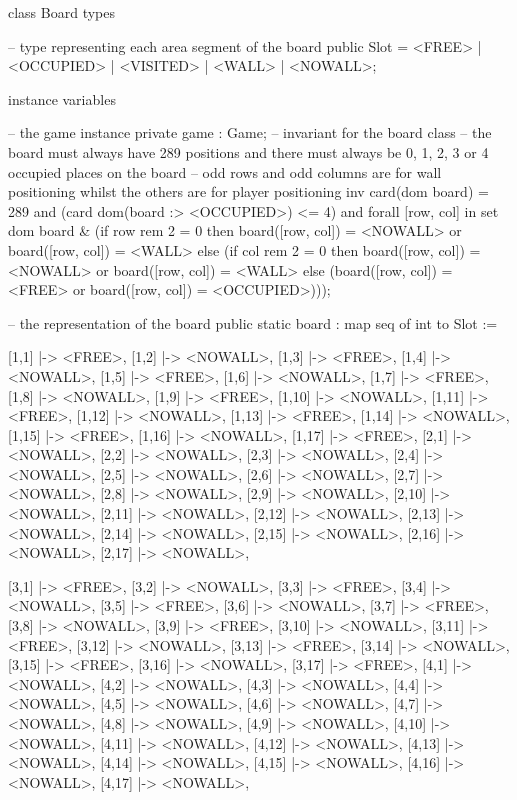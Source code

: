 \begin{vdmpp}[breaklines=true]
class Board
 types
 
  -- type representing each area segment of the board
  public Slot = <FREE> | <OCCUPIED> | <VISITED> | <WALL> | <NOWALL>;

 instance variables
 
  -- the game instance
  private game : Game;
  -- invariant for the board class
  -- the board must always have 289 positions and there must always be 0, 1, 2, 3 or 4 occupied places on the board
  -- odd rows and odd columns are for wall positioning whilst the others are for player positioning
  inv card(dom board) = 289 and (card dom(board :> {<OCCUPIED>}) <= 4)
    and forall [row, col] in set dom board & 
      (if row rem 2 = 0 then board([row, col]) = <NOWALL> or board([row, col]) = <WALL>
        else (if col rem 2 = 0 then board([row, col]) = <NOWALL> or board([row, col]) = <WALL>
          else (board([row, col]) = <FREE> or board([row, col]) = <OCCUPIED>)));
 
  -- the representation of the board
  public static board : map seq of int to Slot := 
    { 
     [1,1] |-> <FREE>, [1,2] |-> <NOWALL>, [1,3] |-> <FREE>, [1,4] |-> <NOWALL>, [1,5] |-> <FREE>, [1,6] |-> <NOWALL>, [1,7] |-> <FREE>, [1,8] |-> <NOWALL>, [1,9] |-> <FREE>, [1,10] |-> <NOWALL>, 
     [1,11] |-> <FREE>, [1,12] |-> <NOWALL>, [1,13] |-> <FREE>, [1,14] |-> <NOWALL>, [1,15] |-> <FREE>, [1,16] |-> <NOWALL>, [1,17] |-> <FREE>,
     [2,1] |-> <NOWALL>, [2,2] |-> <NOWALL>, [2,3] |-> <NOWALL>, [2,4] |-> <NOWALL>, [2,5] |-> <NOWALL>, [2,6] |-> <NOWALL>, [2,7] |-> <NOWALL>, [2,8] |-> <NOWALL>, [2,9] |-> <NOWALL>, [2,10] |-> <NOWALL>, 
     [2,11] |-> <NOWALL>, [2,12] |-> <NOWALL>, [2,13] |-> <NOWALL>, [2,14] |-> <NOWALL>, [2,15] |-> <NOWALL>, [2,16] |-> <NOWALL>, [2,17] |-> <NOWALL>,
     
     [3,1] |-> <FREE>, [3,2] |-> <NOWALL>, [3,3] |-> <FREE>, [3,4] |-> <NOWALL>, [3,5] |-> <FREE>, [3,6] |-> <NOWALL>, [3,7] |-> <FREE>, [3,8] |-> <NOWALL>, [3,9] |-> <FREE>, [3,10] |-> <NOWALL>, 
     [3,11] |-> <FREE>, [3,12] |-> <NOWALL>, [3,13] |-> <FREE>, [3,14] |-> <NOWALL>, [3,15] |-> <FREE>, [3,16] |-> <NOWALL>, [3,17] |-> <FREE>,
     [4,1] |-> <NOWALL>, [4,2] |-> <NOWALL>, [4,3] |-> <NOWALL>, [4,4] |-> <NOWALL>, [4,5] |-> <NOWALL>, [4,6] |-> <NOWALL>, [4,7] |-> <NOWALL>, [4,8] |-> <NOWALL>, [4,9] |-> <NOWALL>, [4,10] |-> <NOWALL>, 
     [4,11] |-> <NOWALL>, [4,12] |-> <NOWALL>, [4,13] |-> <NOWALL>, [4,14] |-> <NOWALL>, [4,15] |-> <NOWALL>, [4,16] |-> <NOWALL>, [4,17] |-> <NOWALL>,
  
}
\end{vdmpp}
